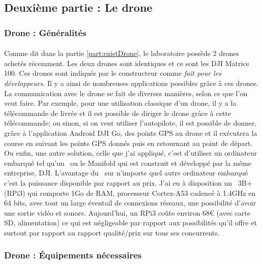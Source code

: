 \subsection{Deuxième partie : Le drone}
\label{part:drone}
    \subsubsection{Drone : Généralités}
        \paragraph*{}
        Comme dit dans la partie \ref{part:existDrone}, le laboratoire possède 2 drones achetés récemment. Les deux drones sont identiques et ce sont les DJI Matrice 100\cite{matrice100}. Ces drones sont indiqués par le constructeur comme \textit{fait pour les développeurs}. Il y a ainsi de nombreuses applications possibles grâce à ces drones. La communication avec le drone se fait de diverses manières, selon ce que l'on veut faire. Par exemple, pour une utilisation classique d'un drone, il y a la télécommande de livrée et il est possible de diriger le drone grâce à cette télécommande; ou sinon, si on veut utiliser l'autopilote, il est possible de donner, grâce à l'application Android DJI Go, des points GPS au drone et il exécutera la course en suivant les points GPS donnés puis en retournant au point de départ. Ou enfin, une autre solution, celle que j'ai appliqué, c'est d'utiliser un ordinateur embarqué tel qu'un \rpi ~ou le Manifold\cite{manifold} qui est construit et développé par la même entreprise, DJI. L'avantage du \rpi ~sur n'importe quel autre ordinateur embarqué c'est la puissance disponible par rapport au prix. J'ai eu à disposition un \rpi ~3B+ (RPi3) qui comporte 1Go de RAM, processeur Cortex-A53 cadencé à 1.4GHz en 64 bits, avec tout un large éventail de connexions réseaux, une possibilité d'avoir une sortie vidéo et sonore. Aujourd'hui, un RPi3 coûte environ 68€ (avec carte SD, alimentation) ce qui est négligeable par rapport aux possibilités qu'il offre et surtout par rapport au rapport qualité/prix sur tous ses concurrents.
            
    \subsubsection{Drone : Équipements nécessaires}
